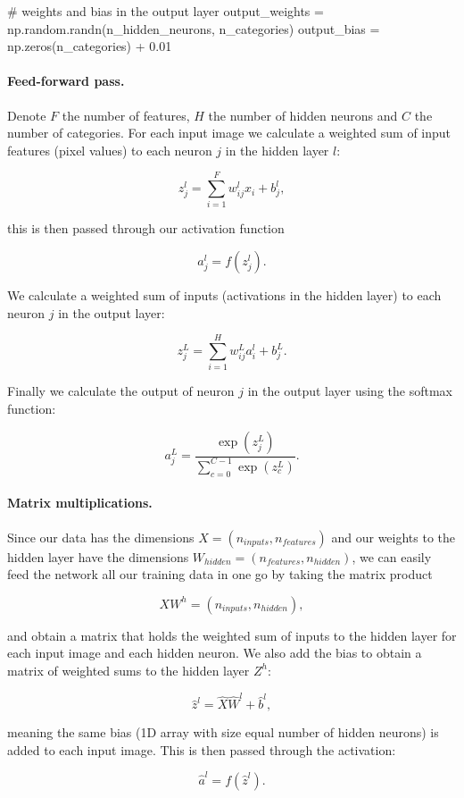 \documentclass[%
oneside,                 %
final,                   %
10pt]{article}
\begin{document}
# weights and bias in the output layer
output_weights = np.random.randn(n_hidden_neurons, n_categories)
output_bias = np.zeros(n_categories) + 0.01
\epycod

\paragraph{Feed-forward pass.}
Denote $F$ the number of features, $H$ the number of hidden neurons and $C$ the number of categories.  
For each input image we calculate a weighted sum of input features (pixel values) to each neuron $j$ in the hidden layer $l$:  

$$ z_{j}^{l} = \sum_{i=1}^{F} w_{ij}^{l} x_i + b_{j}^{l},$$

this is then passed through our activation function  

$$ a_{j}^{l} = f(z_{j}^{l}) .$$  

We calculate a weighted sum of inputs (activations in the hidden layer) to each neuron $j$ in the output layer:  

$$ z_{j}^{L} = \sum_{i=1}^{H} w_{ij}^{L} a_{i}^{l} + b_{j}^{L}.$$  

Finally we calculate the output of neuron $j$ in the output layer using the softmax function:  

$$ a_{j}^{L} = \frac{\exp{(z_j^{L})}}
{\sum_{c=0}^{C-1} \exp{(z_c^{L})}} .$$  

\paragraph{Matrix multiplications.}
Since our data has the dimensions $X = (n_{inputs}, n_{features})$ and our weights to the hidden
layer have the dimensions  
$W_{hidden} = (n_{features}, n_{hidden})$,
we can easily feed the network all our training data in one go by taking the matrix product  

$$ X W^{h} = (n_{inputs}, n_{hidden}),$$ 

and obtain a matrix that holds the weighted sum of inputs to the hidden layer
for each input image and each hidden neuron.    
We also add the bias to obtain a matrix of weighted sums to the hidden layer $Z^{h}$:  

$$ \hat{z}^{l} = \hat{X} \hat{W}^{l} + \hat{b}^{l} ,$$

meaning the same bias (1D array with size equal number of hidden neurons) is added to each input image.  
This is then passed through the activation:  

$$ \hat{a}^{l} = f(\hat{z}^l) .$$  
\end{document}
